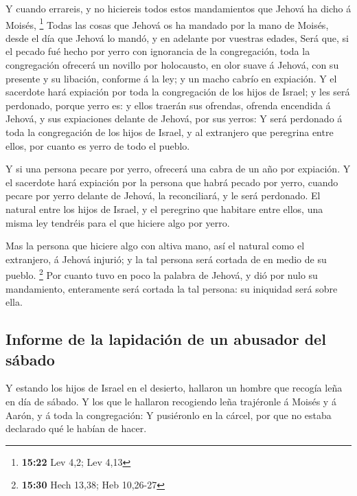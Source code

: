  Y cuando errareis, y no hiciereis todos estos mandamientos
que Jehová ha dicho á Moisés, \footnote{\textbf{15:22} Lev 4,2; Lev 4,13}
 Todas las cosas que Jehová os ha mandado por la mano de
Moisés, desde el día que Jehová lo mandó, y en adelante por vuestras
edades,  Será que, si el pecado fué hecho por yerro con
ignorancia de la congregación, toda la congregación ofrecerá un novillo
por holocausto, en olor suave á Jehová, con su presente y su libación,
conforme á la ley; y un macho cabrío en expiación.  Y el
sacerdote hará expiación por toda la congregación de los hijos de
Israel; y les será perdonado, porque yerro es: y ellos traerán sus
ofrendas, ofrenda encendida á Jehová, y sus expiaciones delante de
Jehová, por sus yerros:  Y será perdonado á toda la
congregación de los hijos de Israel, y al extranjero que peregrina entre
ellos, por cuanto es yerro de todo el pueblo.

 Y si una persona pecare por yerro, ofrecerá una cabra de
un año por expiación.  Y el sacerdote hará expiación por la
persona que habrá pecado por yerro, cuando pecare por yerro delante de
Jehová, la reconciliará, y le será perdonado.  El natural
entre los hijos de Israel, y el peregrino que habitare entre ellos, una
misma ley tendréis para el que hiciere algo por yerro.

 Mas la persona que hiciere algo con altiva mano, así el
natural como el extranjero, á Jehová injurió; y la tal persona será
cortada de en medio de su pueblo. \footnote{\textbf{15:30} Hech 13,38;
  Heb 10,26-27}  Por cuanto tuvo en poco la palabra de
Jehová, y dió por nulo su mandamiento, enteramente será cortada la tal
persona: su iniquidad será sobre ella.

\hypertarget{informe-de-la-lapidaciuxf3n-de-un-abusador-del-suxe1bado}{%
\subsection{Informe de la lapidación de un abusador del
sábado}\label{informe-de-la-lapidaciuxf3n-de-un-abusador-del-suxe1bado}}

 Y estando los hijos de Israel en el desierto, hallaron un
hombre que recogía leña en día de sábado.  Y los que le
hallaron recogiendo leña trajéronle á Moisés y á Aarón, y á toda la
congregación:  Y pusiéronlo en la cárcel, por que no estaba
declarado qué le habían de hacer.

